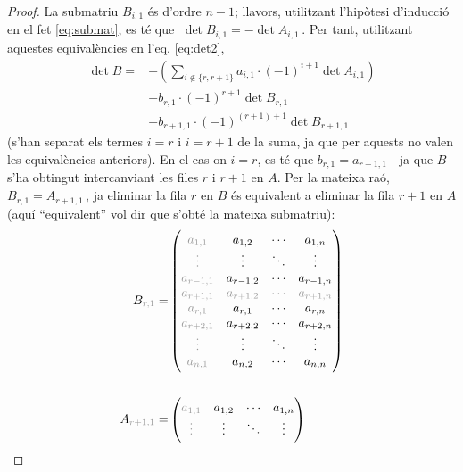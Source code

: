 \begin{s-lema}
\begin{proof}
		La submatriu $B_{i,1}$ és d'ordre $n-1$; llavors, utilitzant l'hipòtesi d'inducció en el fet \eqref{eq:submat}, es té que $\;\det B_{i,1} = - \det A_{i,1}\,$. Per tant, utilitzant aquestes equivalències en l'eq. \eqref{eq:det2},
		\begin{equation}\label{eq:dev1}
		\begin{split}
		\det B =& 	-\left(\sum_{i\notin \{r, r+1\}} a_{i,1}\cdot(-1)^{i+1}\det A_{i,1}\right)\\
		&	+ b_{r,1}\cdot(-1)^{r+1}\det B_{r,1}\\
		&	+ b_{r+1,1}\cdot(-1)^{(r+1)+1}\det B_{r+1,1}\,
		\end{split}
		\end{equation}
		(s'han separat els termes $i=r$ i $i=r+1$ de la suma, ja que per aquests no valen les equivalències anteriors).
		En el cas on $i = r$, es té que $b_{r,1} = a_{r+1,1}$---ja que $B$ s'ha obtingut intercanviant les files $r$ i $r+1$ en $A$. Per la mateixa raó, $B_{r,1} = A_{r+1, 1}\,$, ja eliminar la fila $r$ en $B$ és equivalent a eliminar la fila $r+1$ en $A$ (aquí ``equivalent'' vol dir que s'obté la mateixa submatriu):
		\begin{alignat*}{2}
		B_{\color[gray]{0.6}r,1} = &
		\begin{pmatrix}
		\color[gray]{0.6}
		a_{1,1} &	a_{1,2} &	\cdots &	a_{1,n} \\
		\color[gray]{0.6}
		\vdots &	\vdots &	\ddots &	\vdots \\
		\color[gray]{0.6}
		a_{r-1,1} &	a_{r-1,2} &	\cdots &	a_{r-1,n} \\
		\color[gray]{0.6}
		a_{r+1,1} &	\color[gray]{0.6}a_{r+1,2} &\color[gray]{0.6}	\cdots &	\color[gray]{0.6}a_{r+1,n}  \\
		\color[gray]{0.6}
		a_{r,1} &	a_{r,1} &	\cdots &	a_{r,n} \\
		\color[gray]{0.6}
		a_{r+2,1} &	a_{r+2,2} &	\cdots &	a_{r+2,n} \\
		\color[gray]{0.6}
		\vdots &	\vdots &	\ddots &	\vdots \\
		\color[gray]{0.6}
		a_{n,1} &	a_{n,2} &	\cdots &	a_{n,n} \\
		\end{pmatrix}
		\\ \\
		A_{\color[gray]{0.6}r+1,1} = &
		\begin{pmatrix}
		\color[gray]{0.6}
		a_{1,1} &	a_{1,2} &	\cdots &	a_{1,n} \\
		\color[gray]{0.6}
		\vdots &	\vdots &	\ddots &	\vdots \\

\end{pmatrix}
\end{alignat*}
\end{proof}
\end{s-lema}
